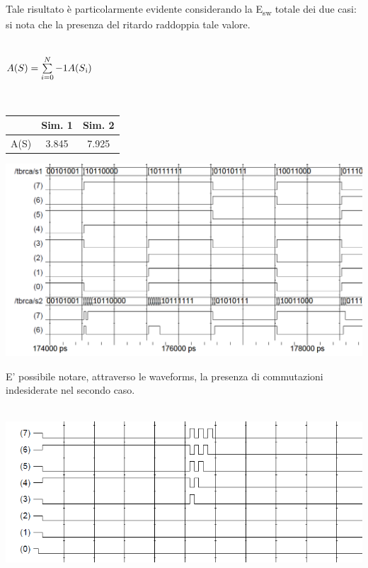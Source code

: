 \documentclass[11pt,  english, makeidx, a4paper, titlepage, oneside]{book}
\begin{document}
\\\\
Tale risultato è particolarmente evidente considerando la E\textsubscript{sw} totale dei due casi: si nota che la presenza del ritardo raddoppia tale valore.\\\\
\centerline{$A(S) = \sum\limits_{i=0}^N-1 A(S\textsubscript{i})$}\\
\vspace{0.2cm}
\begin{center}
\begin{tabular}{|c|c|c|}
\hline
 & Sim. 1 & Sim. 2 \\
\hline
A(S) & 3.845 & 7.925\\
\hline
\end{tabular}
\end{center}
\vspace{0.3cm}
\centerline{\includegraphics[width=15cm]{./img/Lab_1/Es_2/Glitch.png}}
\newpage
E' possibile notare, attraverso le waveforms, la presenza di commutazioni indesiderate nel secondo caso.
\\\\
 \centerline{\includegraphics[width=15cm]{./img/Lab_1/Es_2/Glitch_worst_case.png}}
\\\\
\end{document}
